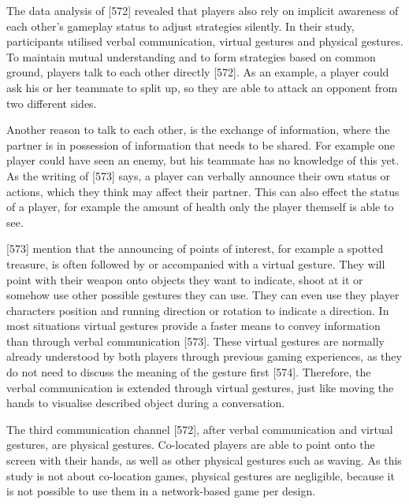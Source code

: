 The data analysis of \textcite{Cheung2012CommunicationGaming}[572] revealed that players also rely on implicit awareness of each other’s gameplay status to adjust strategies silently. In their study, participants utilised verbal communication, virtual gestures and physical gestures.
To maintain mutual understanding and to form strategies based on common ground, players talk to each other directly \autocite{Cheung2012CommunicationGaming}[572]. As an example, a player could ask his or her teammate to split up, so they are able to attack an opponent from two different sides.

Another reason to talk to each other, is the exchange of information, where the partner is in possession of information that needs to be shared. For example one player could have seen an enemy, but his teammate has no knowledge of this yet. As the writing of \textcite{Cheung2012CommunicationGaming}[573] says, a player can verbally announce their own status or actions, which they think may affect their partner. This can also effect the status of a player, for example the amount of health only the player themself is able to see.

\textcite{Cheung2012CommunicationGaming}[573] mention that the announcing of points of interest, for example a spotted treasure, is often followed by or accompanied with a virtual gesture. They will point with their weapon onto objects they want to indicate, shoot at it or somehow use other possible gestures they can use. They can even use they player characters position and running direction or rotation to indicate a direction.
In most situations virtual gestures provide a faster means to convey information than through verbal communication \autocite{Cheung2012CommunicationGaming}[573]. These virtual gestures are normally already understood by both players through previous gaming experiences, as they do not need to discuss the meaning of the gesture first \autocite{Cheung2012CommunicationGaming}[574].
Therefore, the verbal communication is extended through virtual gestures, just like moving the hands to visualise described object during a conversation.


The third communication channel \textcite{Cheung2012CommunicationGaming}[572], after verbal communication and virtual gestures, are physical gestures. Co-located players are able to point onto the screen with their hands, as well as other physical gestures such as waving. As this study is not about co-location games, physical gestures are negligible, because it is not possible to use them in a network-based game per design.


